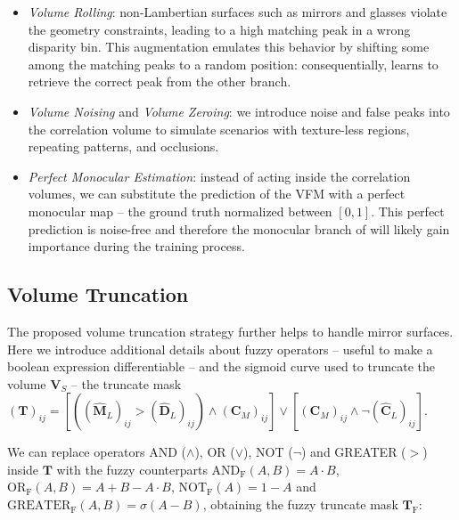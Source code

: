 \begin{itemize}
    \item \textit{Volume Rolling}: non-Lambertian surfaces such as mirrors and glasses violate the geometry constraints, leading to a high matching peak in a wrong disparity bin. This augmentation emulates this behavior by shifting some among the matching peaks to a random position: consequentially, \method learns to retrieve the correct peak from the other branch. \\
    \item \textit{Volume Noising} and \textit{Volume Zeroing}: we introduce noise and false peaks into the correlation volume to simulate scenarios with texture-less regions, repeating patterns, and occlusions. \\
    \item \textit{Perfect Monocular Estimation}: instead of acting inside the correlation volumes, we can substitute the prediction of the VFM with a perfect monocular map  -- the ground truth normalized between $[0,1]$. This perfect prediction is noise-free and therefore the monocular branch of \method will likely gain importance during the training process.
\end{itemize}

\subsection{Volume Truncation}
\label{subsec:vol_trunc}

The proposed volume truncation strategy further helps \method to handle mirror surfaces.
Here we introduce additional details about fuzzy operators -- useful to make a boolean expression differentiable -- and the sigmoid curve used to truncate the volume $\mathbf{V}_S$  -- the truncate mask $(\mathbf{T})_{ij} = \left[\left((\hat{\mathbf{M}}_L)_{ij} >(\hat{\mathbf{D}}_L)_{ij}\right) \land (\mathbf{C}_M)_{ij} \right] \lor \left[ (\mathbf{C}_M)_{ij} \land \neg(\hat{\mathbf{C}}_L)_{ij} \right]$.

We can replace operators AND ($\land$), OR ($\lor$), NOT ($\neg$) and GREATER ($>$) inside $\mathbf{T}$ with the fuzzy counterparts $\text{AND}_\text{F}(A,B) = A \cdot B$, $\text{OR}_\text{F}(A,B) = A+B-A \cdot B$, $\text{NOT}_\text{F}(A) = 1- A$ and $\text{GREATER}_\text{F}(A,B) = \sigma(A-B)$, obtaining the fuzzy truncate mask $\mathbf{T}_\text{F}$:

